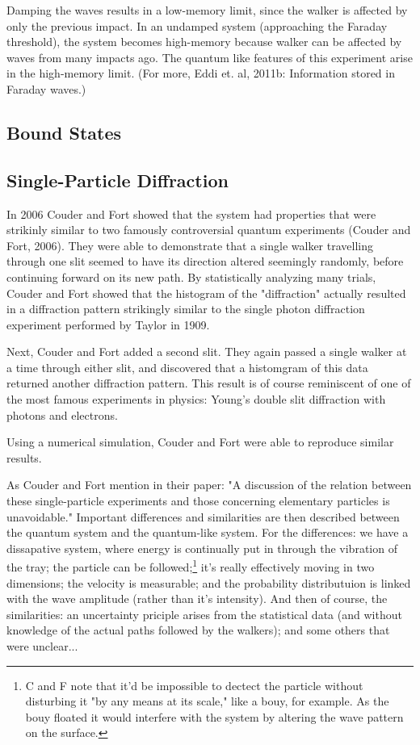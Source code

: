             Damping the waves results in a low-memory limit, since the walker is affected by only the previous impact. In an undamped system (approaching the Faraday threshold), the system becomes high-memory because walker can be affected by waves from many impacts ago. The quantum like features of this experiment arise in the high-memory limit. (For more, Eddi et. al, 2011b: Information stored in Faraday waves.) 

            \subsection{Bound States}

            \subsection{Single-Particle Diffraction}
In 2006 Couder and Fort showed that the system had properties that were strikinly similar to two famously controversial quantum experiments (Couder and Fort, 2006). They were able to demonstrate that a single walker travelling through one slit seemed to have its direction altered seemingly randomly, before continuing forward on its new path. By statistically analyzing many trials, Couder and Fort showed that the histogram of the "diffraction" actually resulted in a diffraction pattern strikingly similar to the single photon diffraction experiment performed by Taylor in 1909. 

Next, Couder and Fort added a second slit. They again passed a single walker at a time through either slit, and discovered that a histomgram of this data returned another diffraction pattern. This result is of course reminiscent of one of the most famous experiments in physics: Young's double slit diffraction with photons and electrons. 
    
Using a numerical simulation, Couder and Fort were able to reproduce similar results. 
    
As Couder and Fort mention in their paper: "A discussion of the relation between these single-particle experiments and those concerning elementary particles is unavoidable." Important differences and similarities are then described between the quantum system and the quantum-like system. For the differences: we have a dissapative system, where energy is continually put in through the vibration of the tray; the particle can be followed;\footnote{C and F note that it'd be impossible to dectect the particle without disturbing it "by any means at its scale," like a bouy, for example. As the bouy floated it would interfere with the system by altering the wave pattern on the surface.} it's really effectively moving in two dimensions; the velocity is measurable; and the probability distributuion is linked with the wave amplitude (rather than it's intensity). And then of course, the similarities: an uncertainty priciple arises from the statistical data (and without knowledge of the actual paths followed by the walkers); and some others that were unclear...

